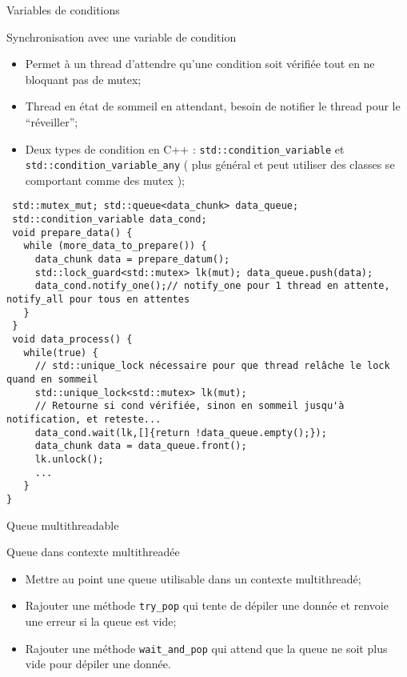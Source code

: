 \documentclass[handout,10pt]{beamer}
\begin{document}
\begin{frame}[fragile]{Variables de conditions}
\tiny
 \begin{block}{Synchronisation avec une variable de condition}
  \begin{itemize}
   \item Permet à un thread d'attendre qu'une condition soit vérifiée tout en ne bloquant pas de mutex;
   \item Thread en état de sommeil en attendant, besoin de notifier le thread pour le ``réveiller'';
   \item Deux types de condition en C++ : \lstinline$std::condition_variable$ et \lstinline$std::condition_variable_any$ ( plus général et peut utiliser des classes
   se comportant comme des mutex );
  \end{itemize}
\begin{lstlisting}
 std::mutex_mut; std::queue<data_chunk> data_queue;
 std::condition_variable data_cond;
 void prepare_data() {
   while (more_data_to_prepare()) {
     data_chunk data = prepare_datum();
     std::lock_guard<std::mutex> lk(mut); data_queue.push(data); 
     data_cond.notify_one();// notify_one pour 1 thread en attente, notify_all pour tous en attentes
   }
 }
 void data_process() {
   while(true) {
     // std::unique_lock nécessaire pour que thread relâche le lock quand en sommeil
     std::unique_lock<std::mutex> lk(mut);
     // Retourne si cond vérifiée, sinon en sommeil jusqu'à notification, et reteste...
     data_cond.wait(lk,[]{return !data_queue.empty();});
     data_chunk data = data_queue.front();
     lk.unlock();
     ...
   }
}
\end{lstlisting}

 \end{block}

\end{frame}

\begin{frame}[fragile]{Queue multithreadable}
\tiny
 \begin{block}{Queue dans contexte multithreadée}
  \begin{itemize}
   \item Mettre au point une queue utilisable dans un contexte multithreadé;
   \item Rajouter une méthode \lstinline$try_pop$ qui tente de dépiler une donnée et renvoie une erreur si la queue est vide;
   \item Rajouter une méthode \lstinline$wait_and_pop$ qui attend que la queue ne soit plus vide pour dépiler une donnée.   
  \end{itemize}
 \end{block}
\end{frame}
\end{document}
